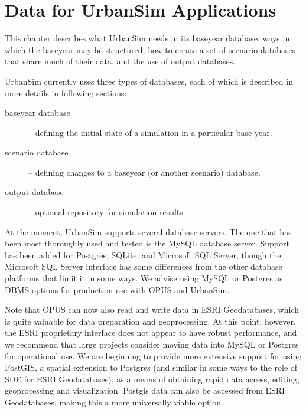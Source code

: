 
\chapter{Data for UrbanSim Applications}
\label{chapter:urbansim-database-tables}


This chapter describes what UrbanSim needs in its baseyear database, ways in
which the baseyear may be structured, how to create a set of scenario databases
that share much of their data, and the use of output databases.

UrbanSim currently uses three types of databases, each of which is described in
more details in following sections:

\begin{description}
\item[baseyear database] -- defining the initial state of a simulation in a
particular base year.
\item[scenario database] -- defining changes to a baseyear (or another scenario)
database.
\item[output database] -- optional repository for simulation results.
\end{description}

At the moment, UrbanSim supports several database servers.  The one that has been most thoroughly 
used and tested is the MySQL \mysqlindex database server.  Support has been added for Postgres, 
SQLite, and Microsoft SQL Server, though the Microsoft SQL Server interface has some differences
from the other database platforms that limit it in some ways.  We advise using MySQL or Postgres as
 DBMS options for production use with OPUS and UrbanSim.

Note that OPUS can now also read and write data in ESRI Geodatabases, which is quite valuable for 
data preparation and geoprocessing.  At this point, however, the ESRI proprietary interface does
not appear to have robust performance, and we recommend that large projects consider moving
data into MySQL or Postgres for operational use.  We are beginning to provide more extensive
support for using PostGIS, a spatial extension to Postgres (and similar in some ways to the role of
SDE for ESRI Geodatabases), as a means of obtaining rapid data access, editing, geoprocessing
and visualization.  Postgis data can also be accessed from ESRI Geodatabases, making this
a more universally viable option.

